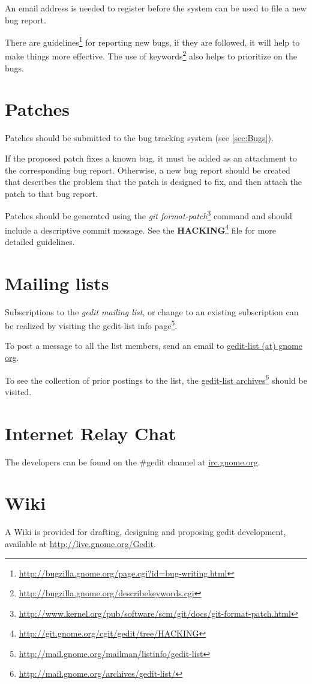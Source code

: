 An email address is needed to register before the system can be used to file a new bug report.

There are guidelines\footnote{\url{http://bugzilla.gnome.org/page.cgi?id=bug-writing.html}} for reporting new bugs, if they are followed, it will help to make things more effective. The use of keywords\footnote{\url{http://bugzilla.gnome.org/describekeywords.cgi}} also helps to prioritize on the bugs.

\section{Patches}\label{sec:Patches}

Patches should be submitted to the bug tracking system (see \ref{sec:Bugs}).

If the proposed patch fixes a known bug, it must be added as an attachment to the corresponding bug report. Otherwise, a new bug report should be created that describes the problem that the patch is designed to fix, and then attach the patch to that bug report.

Patches should be generated using the \textit{git format-patch}\footnote{\url{http://www.kernel.org/pub/software/scm/git/docs/git-format-patch.html}} command and should include a descriptive commit message. See the \textbf{HACKING}\footnote{\url{http://git.gnome.org/cgit/gedit/tree/HACKING}} file for more detailed guidelines.

\section{Mailing lists}\label{sec:Mailing}

Subscriptions to the \emph{gedit mailing list}, or change to an existing subscription can be realized by visiting the gedit-list info page\footnote{\url{http://mail.gnome.org/mailman/listinfo/gedit-list}}.

To post a message to all the list members, send an email to \href{mailto:gedit-list@gnome org}{gedit-list (at) gnome org}.

To see the collection of prior postings to the list, the \href{http://mail.gnome.org/archives/gedit-list/}{gedit-list archives}\footnote{\url{http://mail.gnome.org/archives/gedit-list/}} should be visited.

\section{Internet Relay Chat}\label{sec:IRC}

The developers can be found on the \#gedit channel at \url{irc.gnome.org}.

\section{Wiki}\label{sec:Wiki}

A Wiki is provided for drafting, designing and proposing gedit development, available at \url{http://live.gnome.org/Gedit}.
